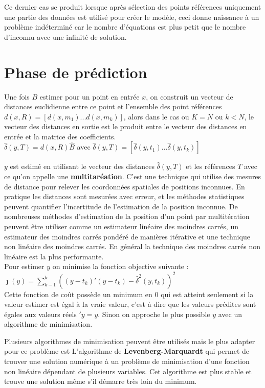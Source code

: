 \documentclass[12pt,a4paper]{report}
\begin{document}
Ce dernier cas se produit lorsque après sélection des points références uniquement une partie des données est utilisé pour créer le modèle, ceci donne naissance à un problème indéterminé car le nombre d'équations est plus petit que le nombre d'inconnu avec une infinité de solution. 

{\color{MidnightBlue}\section{Phase de prédiction}}
\par Une fois $B$ estimer pour un point en entrée $x$, on construit un vecteur de distances euclidienne entre ce point et l'ensemble des point références $d(x,R) = [d(x,m_1)...d(x,m_k)]$, alors dans le cas ou $K = N$ ou $k < N$, le vecteur des distances en sortie est le produit entre le vecteur des distances en entrée et la matrice des coefficients.\\
$\hat{\delta}(y,T) = d(x,R)\hat{B}$ avec $\hat{\delta}(y,T) = [\hat{\delta}(y,t_1)...\hat{\delta}(y,t_k)]$

\par $y$ est estimé en utilisant le vecteur des distances $\hat{\delta}(y,T)$ et les références $T$ avec ce qu'on appelle une \textbf{multitaréation}. C'est une technique qui utilise des mesures de distance pour relever les coordonnées spatiales de positions inconnues. En pratique les distances sont mesurées avec erreur, et les méthodes statistiques peuvent quantifier l'incertitude de l'estimation de la position inconnue. De nombreuses méthodes d'estimation de la position d'un point par multitération peuvent être utiliser comme un estimateur linéaire des moindres carrés, un estimateur des moindres carrés pondéré de manières itérative et une technique non linéaire des moindres carrés. En général la technique des moindres carrés non linéaire est la plus performante.\\
Pour estimer $y$ on minimise la fonction objective suivante :\\
$\jmath(y) = \sum_{k-1}^{k}((y-t_k)\prime(y-t_k)-\hat{\delta}^2(y,t_k))^2$ \\
Cette fonction de coût possède un minimum en 0 qui est atteint seulement si la valeur estimer est égal à la vraie valeur, c'est à dire que les valeurs prédites sont égales aux  valeurs réels $\prime{y} = y$. Sinon on approche le plus possible $y$ avec un algorithme de minimisation. \\
\par Plusieurs algorithmes de minimisation peuvent être utilisés mais le plus adapter pour ce problème est L'algorithme de \textbf{Levenberg-Marquardt} qui permet de trouver une solution numérique à un problème de minimisation d'une fonction non linéaire dépendant de plusieurs variables. Cet algorithme est plus stable et trouve une solution même s'il démarre très loin du minimum. 
\end{document}
